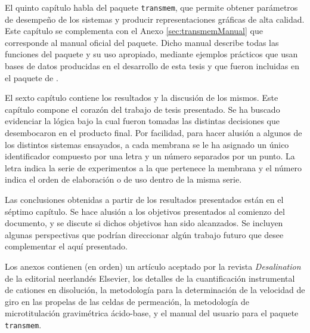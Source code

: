El quinto capítulo habla del paquete \verb|transmem|, que permite obtener parámetros de desempeño de los sistemas y producir representaciones gráficas de alta calidad. Este capítulo se complementa con el Anexo \ref{sec:transmemManual} que corresponde al manual oficial del paquete. Dicho manual describe todas las funciones del paquete y su uso apropiado, mediante ejemplos prácticos que usan bases de datos producidas en el desarrollo de esta tesis y que fueron incluidas en el paquete de \R. 

El sexto capítulo contiene los resultados y la discusión de los mismos. Este capítulo compone el corazón del trabajo de tesis presentado. Se ha buscado evidenciar la lógica bajo la cual fueron tomadas las distintas decisiones que desembocaron en el producto final. Por facilidad, para hacer alusión a algunos de los distintos sistemas ensayados, a cada membrana se le ha asignado un único identificador compuesto por una letra y un número separados por un punto. La letra indica la serie de experimentos a la que pertenece la membrana y el número indica el orden de elaboración o de uso dentro de la misma serie. 

Las conclusiones obtenidas a partir de los resultados presentados están en el séptimo capítulo. Se hace alusión a los objetivos presentados al comienzo del documento, y se discute si dichos objetivos han sido alcanzados. Se incluyen algunas perspectivas que podrían direccionar algún trabajo futuro que desee complementar el aquí presentado. 

Los anexos contienen (en orden) un artículo aceptado por la revista \textit{Desalination} de la editorial neerlandés Elsevier, los detalles de la cuantificación instrumental de cationes en disolución, la metodología para la determinación de la velocidad de giro en las propelas de las celdas de permeación, la metodología de microtitulación gravimétrica ácido-base, y el manual del usuario para el paquete \verb|transmem|.
\clearpage
{}

